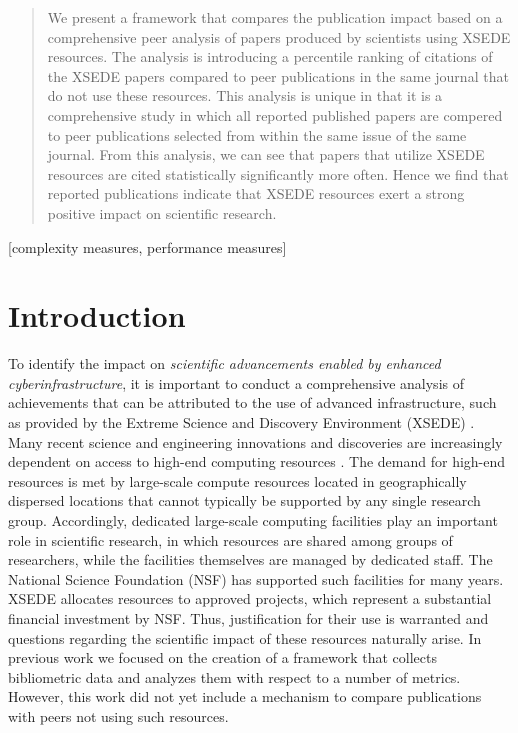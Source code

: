 \documentclass{sig-alternate}
\begin{document}
\begin{abstract}

We present a framework that compares the publication impact based on a comprehensive peer analysis of papers produced by scientists using XSEDE resources. The analysis is introducing a percentile ranking of citations of the XSEDE papers compared to peer publications in the same journal that do not use these resources.  This analysis is unique in that it is a comprehensive study in which all reported published papers are compered to peer publications selected from within the same issue of the same journal. From this analysis, we can see that papers that utilize XSEDE resources are cited statistically significantly more often.  Hence we find that reported publications indicate that XSEDE resources exert a strong positive impact on scientific research.

\end{abstract}


\vspace{-6pt}

[complexity measures,
performance measures]




\section{Introduction} 

To identify the impact on {\em scientific advancements enabled by enhanced cyberinfrastructure}, it is important to conduct a comprehensive analysis of achievements that can be attributed to the use of advanced infrastructure, such as provided by the Extreme Science and Discovery Environment (XSEDE) \cite{www-xsede,xsede}. Many recent science and engineering innovations and discoveries are increasingly dependent on access to high-end computing resources \cite{las14impact}. The demand for high-end resources is met by large-scale compute resources located in geographically dispersed locations that cannot typically be supported by any single research group. Accordingly, dedicated large-scale computing facilities play an important role in scientific research, in which resources are shared among groups of researchers, while the facilities themselves are managed by dedicated staff. The National Science Foundation (NSF) has supported such facilities for many years. XSEDE allocates resources to approved projects, which represent a substantial financial investment by NSF. Thus, justification for their use is warranted and questions regarding the scientific impact of these resources naturally arise. In previous work \cite{las14impact} we focused on the creation of a framework that collects bibliometric data and analyzes them with respect to a number of metrics. However, this work did not yet include a mechanism to compare publications with peers not using such resources.
\end{document}
